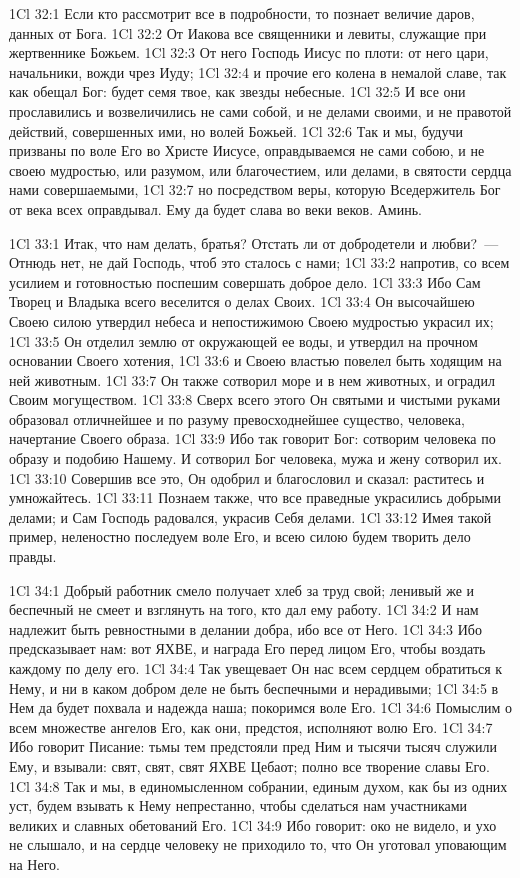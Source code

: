 \vs 1Cl 32:1
Если кто рассмотрит все в
подробности, то познает величие даров, данных от Бога.
\vs 1Cl 32:2
От Иакова все священники и
левиты, служащие при жертвеннике Божьем.
\vs 1Cl 32:3
От него Господь Иисус по
плоти: от него цари, начальники, вожди чрез Иуду;
\vs 1Cl 32:4
и прочие его колена в
немалой славе, так как обещал Бог: будет семя твое, как звезды небесные.
\vs 1Cl 32:5
И все они прославились и
возвеличились не сами собой, и не делами своими, и не правотой действий,
совершенных ими, но волей Божьей.
\vs 1Cl 32:6
Так и мы, будучи призваны
по воле Его во Христе Иисусе, оправдываемся не сами собою, и не своею
мудростью, или разумом, или благочестием, или делами, в святости сердца нами
совершаемыми,
\vs 1Cl 32:7
но посредством веры,
которую Вседержитель Бог от века всех оправдывал. Ему да будет слава во веки
веков. Аминь.

\vs 1Cl 33:1
Итак, что нам делать,
братья? Отстать ли от добродетели и любви?~--- Отнюдь нет, не дай Господь, чтоб
это сталось с нами;
\vs 1Cl 33:2
напротив, со всем усилием
и готовностью поспешим совершать доброе дело.
\vs 1Cl 33:3
Ибо Сам Творец и Владыка
всего веселится о делах Своих.
\vs 1Cl 33:4
Он высочайшею Своею силою
утвердил небеса и непостижимою Своею мудростью украсил их;
\vs 1Cl 33:5
Он отделил землю от
окружающей ее воды, и утвердил на прочном основании Своего хотения,
\vs 1Cl 33:6
и Своею властью повелел
быть ходящим на ней животным.
\vs 1Cl 33:7
Он также сотворил море и в
нем животных, и оградил Своим могуществом.
\vs 1Cl 33:8
Сверх всего этого Он
святыми и чистыми руками образовал отличнейшее и по разуму превосходнейшее
существо, человека, начертание Своего образа.
\vs 1Cl 33:9
Ибо так говорит Бог:
сотворим человека по образу и подобию Нашему. И сотворил Бог человека, мужа и
жену сотворил их.
\vs 1Cl 33:10
Совершив все это, Он
одобрил и благословил и сказал: раститесь и умножайтесь.
\vs 1Cl 33:11
Познаем также, что все
праведные украсились добрыми делами; и Сам Господь радовался, украсив Себя
делами.
\vs 1Cl 33:12
Имея такой пример,
неленостно последуем воле Его, и всею силою будем творить дело правды.

\vs 1Cl 34:1
Добрый работник смело
получает хлеб за труд свой; ленивый же и беспечный не смеет и взглянуть на
того, кто дал ему работу.
\vs 1Cl 34:2
И нам надлежит быть
ревностными в делании добра, ибо все от Него.
\vs 1Cl 34:3
Ибо предсказывает нам:
вот ЯХВЕ, и награда Его перед лицом Его, чтобы воздать каждому по делу его.
\vs 1Cl 34:4
Так увещевает Он нас всем
сердцем обратиться к Нему, и ни в каком добром деле не быть беспечными и
нерадивыми;
\vs 1Cl 34:5
в Нем да будет похвала и
надежда наша; покоримся воле Его.
\vs 1Cl 34:6
Помыслим о всем множестве
ангелов Его, как они, предстоя, исполняют волю Его.
\vs 1Cl 34:7
Ибо говорит Писание: тьмы
тем предстояли пред Ним и тысячи тысяч служили Ему, и взывали: свят, свят,
свят ЯХВЕ Цебаот; полно все творение славы Его.
\vs 1Cl 34:8
Так и мы, в единомысленном
собрании, единым духом, как бы из одних уст, будем взывать к Нему непрестанно,
чтобы сделаться нам участниками великих и славных обетований Его.
\vs 1Cl 34:9
Ибо говорит: око не
видело, и ухо не слышало, и на сердце человеку не приходило то, что Он
уготовал уповающим на Него.

